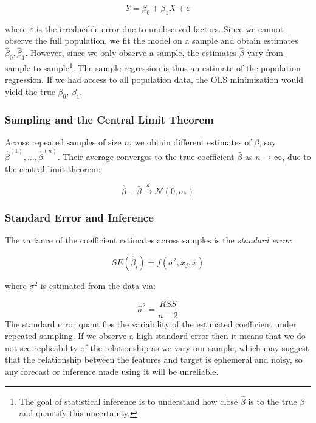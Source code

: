 \documentclass[9pt]{extarticle}
\begin{document}
\[
Y = \beta_0 + \beta_1 X + \varepsilon
\]


where $\varepsilon$ is the irreducible error due to unobserved factors. Since we cannot observe the full population, we fit the model on a sample and obtain estimates $\hat{\beta}_0, \hat{\beta}_1$.
However, since we only observe a sample, the estimates $\hat{\beta}$ vary
from sample to sample\footnote{
 The goal of statistical inference is to understand 
how close $\hat{\beta}$ is to the true $\beta$ and quantify this uncertainty.}.
The sample regression is thus an estimate of the population regression. 
If we had access to all population data, the OLS minimisation would yield the true $\beta_0$, $\beta_1$.


\subsubsection*{Sampling and the Central Limit Theorem}

Across repeated samples of size $n$, we obtain different estimates of $\beta$, say $\hat{\beta}^{(1)}, \dots, \hat{\beta}^{(n)}$. Their average converges to the true coefficient $\bar{\beta}$ as $n \to \infty$, due to the central limit theorem:

\[
\hat{\beta} - \bar{\beta} \xrightarrow{d} \mathcal{N}(0, \sigma_*)
\]

\subsubsection*{Standard Error and Inference}

The variance of the coefficient estimates across samples is the \emph{standard error}:

$$SE(\hat{\beta}_i) = f(\sigma^2, x_j, \bar{x})$$

where $\sigma^2$ is estimated from the data via:

\[
\hat{\sigma}^2 = \frac{RSS}{n - 2}
\]
The standard error quantifies the variability of the estimated coefficient 
under repeated sampling. If we observe a high standard error then it means that we do not see 
replicability of the relationship as we vary our sample, which may suggest that 
the relationship between the features and target is ephemeral and noisy, so 
any forecast or inference made using it will be unreliable.
\end{document}
